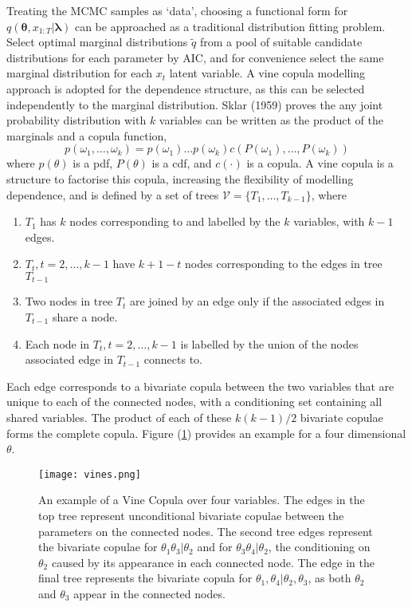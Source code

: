 \documentclass[12pt,a4paper]{article}%
\numberwithin{equation}{section}
\begin{document}
Treating the MCMC samples as `data', choosing a functional form for $q(\boldsymbol{\theta}, x_{1:T} | \boldsymbol{\lambda})$ can be approached as a traditional distribution fitting problem. Select optimal marginal distributions $\tilde{q}$ from a pool of suitable candidate distributions for each parameter by AIC, and for convenience select the same marginal distribution for each $x_t$ latent variable. A vine copula modelling approach is adopted for the dependence structure, as this can be selected independently to the marginal distribution. Sklar (1959) proves the any joint probability distribution with $k$ variables can be written as the product of the marginals and a copula function,
\begin{equation}
\label{vc1}
p(\omega_1, \dots, \omega_k) = p(\omega_1) \dots p(\omega_k) c(P(\omega_1), \dots, P(\omega_k))
\end{equation}
where $p(\theta)$ is a pdf, $P(\theta)$ is a cdf, and $c(\cdot)$ is a copula. A vine copula is a structure to factorise this copula, increasing the flexibility of modelling dependence, and is defined by a set of trees $\mathcal{V} = \{T_1, \dots, T_{k-1} \}$, where
\begin{enumerate}
\item $T_1$ has $k$ nodes corresponding to and labelled by the $k$ variables, with $k-1$ edges.
\item $T_t, t = 2, \dots, k-1$ have $k+1-t$ nodes corresponding to the edges in tree $T_{t-1}$
\item Two nodes in tree $T_t$ are joined by an edge only if the associated edges in $T_{t-1}$ share a node. 
\item Each node in $T_t,  t = 2, \dots, k-1$ is labelled by the union of the nodes associated edge in $T_{t-1}$ connects to.
\end{enumerate}
Each edge corresponds to a bivariate copula between the two variables that are unique to each of the connected nodes, with a conditioning set containing all shared variables. The product of each of these $k(k-1)/2$ bivariate copulae forms the complete copula. Figure (\ref{fig:vinecop}) provides an example for a four dimensional $\theta$.
\begin{figure}[h]
\centering
\texttt{[image: vines.png]}
\vspace{2mm}
\caption{An example of a Vine Copula over four variables. The edges in the top tree represent unconditional bivariate copulae between the parameters on the connected nodes. The second tree edges represent the bivariate copulae for $\theta_1 \theta_3 | \theta_2$ and for $\theta_3 \theta_4 | \theta_2$, the conditioning on $\theta_2$ caused by its appearance in each connected node. The edge in the final tree represents the bivariate copula for $\theta_1, \theta_4 | \theta_2, \theta_3$, as both $\theta_2$ and $\theta_3$ appear in the connected nodes.}
\label{fig:vinecop}
\end{figure}
\end{document}
